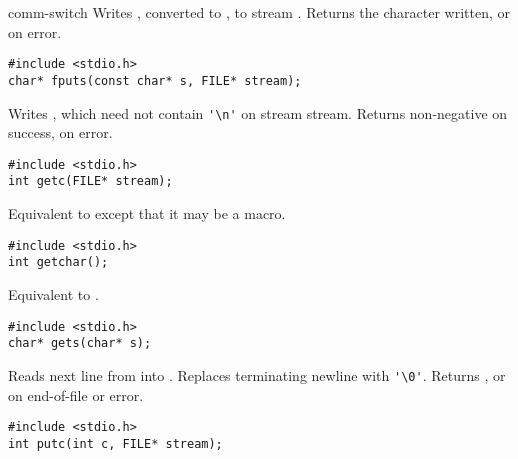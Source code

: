 \begin{Ventry2}{comm-switch  }
     Writes , converted to , to stream . Returns the
     character written, or  on error.

\item[fputs]
\label{item:fputs}
\begin{production}
\begin{verbatim}
#include <stdio.h>
char* fputs(const char* s, FILE* stream);
\end{verbatim}
\end{production}

     Writes , which need not contain \verb+'\n'+ on stream stream. Returns
     non-negative on success,  on error.

\item[getc]
\label{item:getc}
\begin{production}
\begin{verbatim}
#include <stdio.h>
int getc(FILE* stream);
\end{verbatim}
\end{production}

     Equivalent to  except that it may be a macro.

\item[getchar]
\label{item:getchar}
\begin{production}
\begin{verbatim}
#include <stdio.h>
int getchar();
\end{verbatim}
\end{production}

     Equivalent to .

\item[gets]
\label{item:gets}
\begin{production}
\begin{verbatim}
#include <stdio.h>
char* gets(char* s);
\end{verbatim}
\end{production}

     Reads next line from  into . Replaces terminating newline with \verb+'\0'+.
     Returns , or  on end-of-file or error.

\item[putc]
\label{item:putc}
\begin{production}
\begin{verbatim}
#include <stdio.h>
int putc(int c, FILE* stream);
\end{verbatim}
\end{production}


\end{Ventry2}
